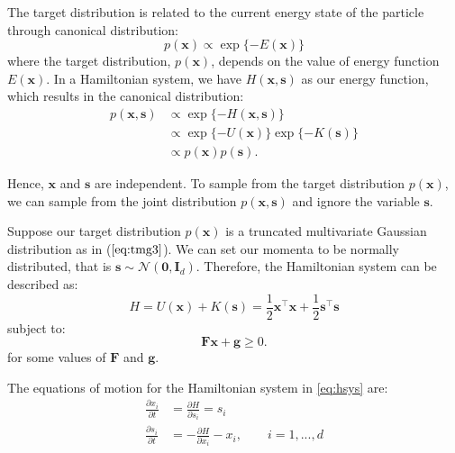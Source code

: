 \documentclass{scrartcl}
\numberwithin{equation}{section}
\begin{document}
The target distribution is related to the current energy state of the particle through canonical distribution:
\begin{equation}\label{eq:can}
	p(\textbf{x}) \propto \exp\{-E(\textbf{x})\}
\end{equation}
where the target distribution, $p(\textbf{x})$, depends on the value of energy function $E(\textbf{x})$. In a Hamiltonian system, we have $H(\textbf{x}, \textbf{s})$ as our energy function, which results in the canonical distribution:
\begin{equation}\label{eq:can2}
\begin{split}
	p(\textbf{x}, \textbf{s}) &\propto \exp\{-H(\textbf{x}, \textbf{s})\} \\
	&\propto \exp\{-U(\textbf{x})\} \exp\{-K(\textbf{s})\} \\
	&\propto p(\textbf{x})p(\textbf{s}).
\end{split}
\end{equation}

Hence, $\textbf{x}$ and $\textbf{s}$ are independent. To sample from the target distribution $p(\textbf{x})$, we can sample from the joint distribution $p(\textbf{x}, \textbf{s})$ and ignore the variable $\textbf{s}$.  

Suppose our target distribution $p(\textbf{x})$ is a truncated multivariate Gaussian distribution as in ($\ref{eq:tmg3}$). We can set our momenta to be normally distributed, that is $\textbf{s} \sim \mathcal{N}(\textbf{0}, \textbf{I}_d)$. Therefore, the Hamiltonian system can be described as: 
\begin{equation}\label{eq:hsys}
	H = U(\textbf{x}) + K(\textbf{s}) = \frac{1}{2}\textbf{x}^{\intercal}\textbf{x} + \frac{1}{2}\textbf{s}^{\intercal}\textbf{s}
\end{equation}
subject to:  
\begin{equation}\label{eq:st}
	\textbf{F}\textbf{x} + \textbf{g} \geq 0.
\end{equation}
for some values of $\textbf{F}$ and $\textbf{g}$.   

The equations of motion for the Hamiltonian system in \eqref{eq:hsys} are:    
\begin{equation}\label{eq:heqs2}
\begin{split}
	\frac{\partial x_i}{\partial t} & = \frac{\partial H}{\partial s_i} = s_i \\
	\frac{\partial s_i}{\partial t} & = -\frac{\partial H}{\partial x_i} -x_i, \qquad i=1,...,d\\
\end{split}
\end{equation}
\end{document}
